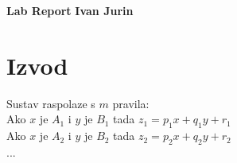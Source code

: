\documentclass[a4paper, 11pt]{article}
\begin{document}
\noindent
\large\textbf{Lab Report} \hfill \textbf{Ivan Jurin} \\

\section*{Izvod}
Sustav raspolaze s $m$ pravila:\\

Ako $x$ je $A_{1}$ i $y$ je $B_{1}$ tada $z_{1}=p_{1}x+q_{1}y+r_{1}$\\

Ako $x$ je $A_{2}$ i $y$ je $B_{2}$ tada $z_{2}=p_{2}x+q_{2}y+r_{2}$\\

...\\
\end{document}
